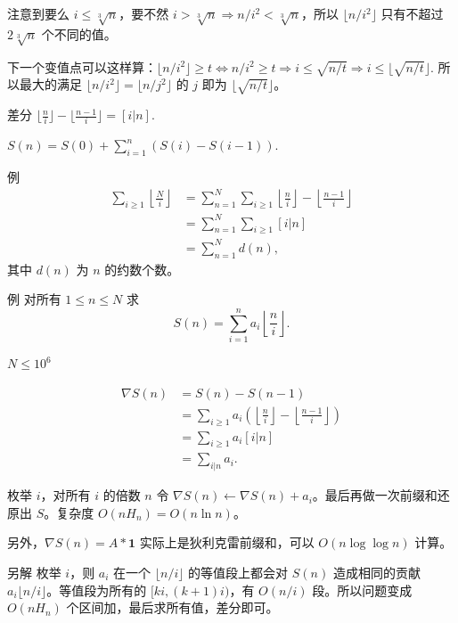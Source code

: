 \begin{frame}
    注意到要么 $i\le \sqrt[3]{n}$，要不然 $i>\sqrt[3]{n}\Rightarrow n/i^2<\sqrt[3]{n}$，所以 $\lfloor n/i^2\rfloor$ 只有不超过 $2\sqrt[3]{n}$ 个不同的值。

    下一个变值点可以这样算：$\lfloor n/i^2\rfloor\ge t\Longleftrightarrow n/i^2\ge t\Longrightarrow i\le \sqrt{n/t}\Longrightarrow i\le\lfloor\sqrt{n/t}\rfloor$. 所以最大的满足 $\lfloor n/i^2\rfloor=\lfloor n/j^2\rfloor$ 的 $j$ 即为 $\lfloor\sqrt{n/t}\rfloor$。
\end{frame}
\begin{frame}{差分}
    $\lfloor\frac{n}{i}\rfloor-\lfloor\frac{n-1}{i}\rfloor=[i|n].$

    $S(n)=S(0)+\sum_{i=1}^n(S(i)-S(i-1)).$
\end{frame}
\begin{frame}{例}
    $$
    \begin{aligned}
    \sum_{i\ge 1}\left\lfloor\frac{N}{i}\right\rfloor&=\sum_{n=1}^N \sum_{i\ge 1}\left\lfloor\frac{n}{i}\right\rfloor-\left\lfloor\frac{n-1}{i}\right\rfloor\\
    &=\sum_{n=1}^N \sum_{i\ge 1}[i|n]\\
    &=\sum_{n=1}^N d(n),
    \end{aligned}
    $$
    其中 $d(n)$ 为 $n$ 的约数个数。
\end{frame}
\begin{frame}{例}
    对所有 $1\le n\le N$ 求
    $$
    S(n)=\sum_{i=1}^n a_i\left\lfloor\frac{n}{i}\right\rfloor.
    $$ 

    $N\le 10^6$
\end{frame}
\begin{frame}
    $$
    \begin{aligned}
    \nabla S(n)&=S(n)-S(n-1)\\
    &=\sum_{i\ge 1}a_i\left(\left\lfloor\frac{n}{i}\right\rfloor-\left\lfloor\frac{n-1}{i}\right\rfloor\right)\\
    &=\sum_{i\ge 1}a_i[i|n]\\
    &=\sum_{i|n}a_i.
    \end{aligned}
    $$

    枚举 $i$，对所有 $i$ 的倍数 $n$ 令 $\nabla S(n)\leftarrow \nabla S(n)+a_i$。最后再做一次前缀和还原出 $S$。复杂度 $O(nH_n)=O(n\ln n)$。

    另外，$\nabla S(n)=A\ast \mathbf 1$ 实际上是狄利克雷前缀和，可以 $O(n\log\log n)$ 计算。
\end{frame}
\begin{frame}{另解}
    枚举 $i$，则 $a_i$ 在一个 $\lfloor n/i\rfloor$ 的等值段上都会对 $S(n)$ 造成相同的贡献 $a_i\lfloor n/i\rfloor$。等值段为所有的 $[ki,(k+1)i)$，有 $O(n/i)$ 段。所以问题变成 $O(nH_n)$ 个区间加，最后求所有值，差分即可。
\end{frame}
